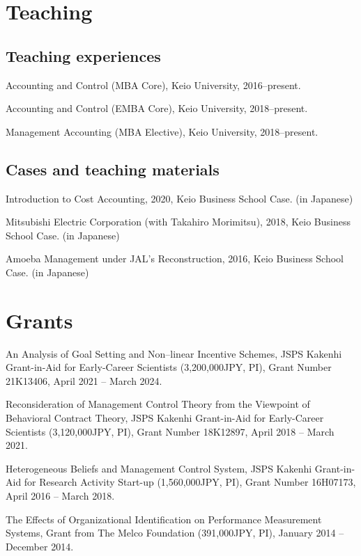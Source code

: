 \documentclass[letterpaper,uplatex]{article}
\renewenvironment{itemize}{
  \begin{list}{}{
    \setlength{\leftmargin}{1.5em}
  }
}{
  \end{list}
}
\begin{document}
\section*{Teaching}

\subsection*{Teaching experiences}

\begin{itemize}
	\item Accounting and Control (MBA Core), Keio University, 2016--present.
	\item Accounting and Control (EMBA Core), Keio University, 2018--present.
	\item Management Accounting (MBA Elective), Keio University, 2018--present.
\end{itemize}

\subsection*{Cases and teaching materials}

\begin{itemize}
   \item Introduction to Cost Accounting, 2020, Keio Business School Case. (in Japanese)
   \item Mitsubishi Electric Corporation (with Takahiro Morimitsu), 2018, Keio Business School Case. (in Japanese)
   \item Amoeba Management under JAL's Reconstruction, 2016, Keio Business School Case. (in Japanese)
\end{itemize}

\section*{Grants}

\begin{itemize}
\item An Analysis of Goal Setting and Non--linear Incentive Schemes, JSPS Kakenhi Grant-in-Aid for Early-Career Scientists (3,200,000JPY, PI), Grant Number 21K13406, April 2021 -- March 2024.

\item Reconsideration of Management Control Theory from the Viewpoint of Behavioral Contract Theory, JSPS Kakenhi Grant-in-Aid for Early-Career Scientists (3,120,000JPY, PI), Grant Number 18K12897, April 2018 -- March 2021.

\item Heterogeneous Beliefs and Management Control System, JSPS Kakenhi Grant-in-Aid for Research Activity Start-up (1,560,000JPY, PI), Grant Number 16H07173, April 2016 -- March 2018.

\item The Effects of Organizational Identification on Performance Measurement Systems, Grant from The Melco Foundation (391,000JPY, PI), January 2014 -- December 2014.
\end{itemize}
\end{document}
